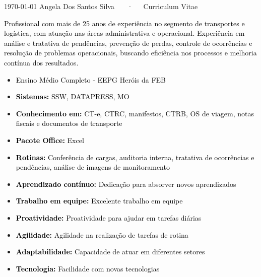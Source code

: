 \documentclass[11pt, a4paper]{awesome-cv}
\begin{document}
\makecvheader

\makecvfooter
  {\today}
  {Angela Dos Santos Silva ~~~·~~~Curriculum Vitae}
  {\thepage}

\begin{cvletter}

\textcolor{black}{Profissional com mais de 25 anos de experiência no segmento de transportes e logística, com atuação nas áreas administrativa e operacional. Experiência em análise e tratativa de pendências, prevenção de perdas, controle de ocorrências e resolução de problemas operacionais, buscando eficiência nos processos e melhoria contínua dos resultados.}

\begin{itemize}
    \item \textcolor{black}{Ensino Médio Completo - EEPG Heróis da FEB}
  \end{itemize}

\begin{itemize}
    \item \textcolor{black}{\textbf{Sistemas:} SSW, DATAPRESS, MO}
    \item \textcolor{black}{\textbf{Conhecimento em:} CT-e, CTRC, manifestos, CTRB, OS de viagem, notas fiscais e documentos de transporte}
    \item \textcolor{black}{\textbf{Pacote Office:} Excel}
    \item \textcolor{black}{\textbf{Rotinas:} Conferência de cargas, auditoria interna, tratativa de ocorrências e pendências, análise de imagens de monitoramento}
\end{itemize}

\begin{itemize}
    \item \textcolor{black}{\textbf{Aprendizado contínuo:} Dedicação para absorver novos aprendizados}
    \item \textcolor{black}{\textbf{Trabalho em equipe:} Excelente trabalho em equipe}
    \item \textcolor{black}{\textbf{Proatividade:} Proatividade para ajudar em tarefas diárias}
    \item \textcolor{black}{\textbf{Agilidade:} Agilidade na realização de tarefas de rotina}
    \item \textcolor{black}{\textbf{Adaptabilidade:} Capacidade de atuar em diferentes setores}
    \item \textcolor{black}{\textbf{Tecnologia:} Facilidade com novas tecnologias}
\end{itemize}



\end{cvletter}
\end{document}
